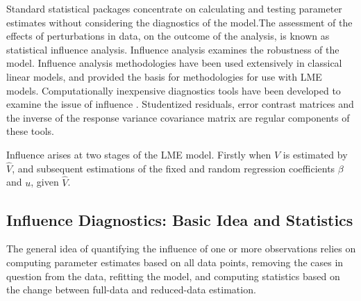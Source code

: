 \documentclass[12pt, a4paper]{article}
\begin{document}
			Standard statistical packages concentrate on calculating and testing parameter estimates without considering the diagnostics of the model.The assessment of the effects of perturbations in data, on the outcome of the analysis, is known as statistical influence analysis. Influence analysis examines the robustness of the model. Influence analysis methodologies have been used extensively in classical linear models, and provided the basis for methodologies for use with LME models.
			Computationally inexpensive diagnostics tools have been developed to examine the issue of influence \citep{Zewotir}.
			Studentized residuals, error contrast matrices and the inverse of the response variance covariance matrix are regular components of these tools.
			
			Influence arises at two stages of the LME model. Firstly when $V$ is estimated by $\hat{V}$, and subsequent
			estimations of the fixed and random regression coefficients $\beta$ and $u$, given $\hat{V}$.
			
			
			
			
			
			
			
			\subsection{Influence Diagnostics: Basic Idea and Statistics} %
			
			The general idea of quantifying the influence of one or more observations relies on computing parameter estimates based on all data points, removing the cases in question from the data, refitting the model, and computing statistics based on the change between full-data and reduced-data estimation. 
			
			
			
\end{document}
